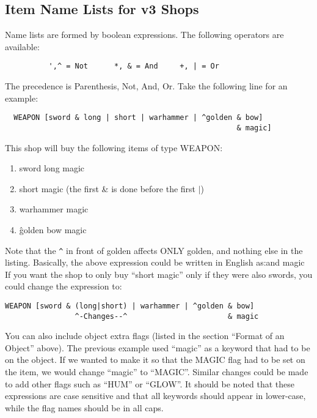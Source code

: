 \documentclass[11pt]{article}
\begin{document}
\subsection{Item Name Lists for v3 Shops}
Name lists are formed by boolean expressions.  The following operators are available:
\begin{verbatim}
          ',^ = Not      *, & = And     +, | = Or
\end{verbatim}
The precedence is Parenthesis, Not, And, Or.  Take the following line for an example:
\begin{verbatim}
  WEAPON [sword & long | short | warhammer | ^golden & bow]
                                                     & magic]
\end{verbatim}
This shop will buy the following items of type WEAPON:
\begin{enumerate}
\item sword long magic
\item short magic (the first \& is done before the first $|$)
\item warhammer magic
\item \^golden bow magic
\end{enumerate}
Note that the \texttt{\^} in front of golden affects ONLY golden, and nothing else in the listing.  Basically, the above expression could be written in English as: and magic\newline
If you want the shop to only buy ``short magic'' only if they were also swords, you could change the expression to:
\begin{verbatim}
WEAPON [sword & (long|short) | warhammer | ^golden & bow]
                ^-Changes--^                       & magic
\end{verbatim}
You can also include object extra flags (listed in the section ``Format of an Object'' above).  The previous example used ``magic'' as a keyword that had to be on the object.  If we wanted to make it so that the MAGIC flag had to be set on the item, we would change ``magic'' to ``MAGIC''.  Similar changes could be made to add other flags such as ``HUM'' or ``GLOW''.  It should be noted that these expressions are case sensitive and that all keywords should appear in lower-case, while the flag names should be in all caps.
\end{document}

